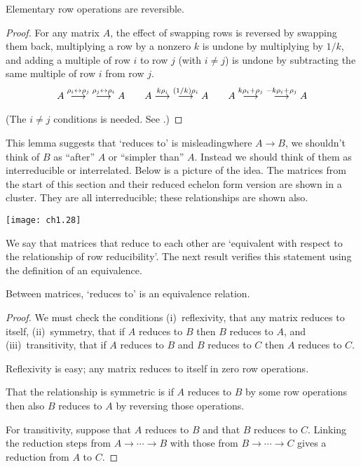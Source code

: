 \begin{lemma} \label{le:RowOpsRev}
Elementary row operations are reversible.
\end{lemma}

\begin{proof}
For any matrix \( A \),
the effect of swapping rows is reversed by swapping them back,
multiplying a row by a nonzero \( k \) is undone by multiplying by
$1/k$,
and adding a multiple of row \( i \) to row \( j \) (with $i\neq j$)
is undone by subtracting the same multiple of row \( i \) from row \( j \).
\begin{equation*}
      A
     \mathrel{ \mathop{\longrightarrow}\limits^{\rho_i\leftrightarrow\rho_j\mathstrut}_{ \begin{subarray}{l} \relax \end{subarray}}}
     \;\mathrel{ \mathop{\longrightarrow}\limits^{\rho_j\leftrightarrow\rho_i\mathstrut}_{ \begin{subarray}{l} \relax \end{subarray}}}
      A
  \qquad
        A
     \mathrel{ \mathop{\longrightarrow}\limits^{k\rho_i\mathstrut}_{ \begin{subarray}{l} \relax \end{subarray}}}
     \;\mathrel{ \mathop{\longrightarrow}\limits^{(1/k)\rho_i\mathstrut}_{ \begin{subarray}{l} \relax \end{subarray}}}
      A
  \qquad
        A
     \mathrel{ \mathop{\longrightarrow}\limits^{k\rho_i+\rho_j\mathstrut}_{ \begin{subarray}{l} \relax \end{subarray}}}
     \;\mathrel{ \mathop{\longrightarrow}\limits^{-k\rho_i+\rho_j\mathstrut}_{ \begin{subarray}{l} \relax \end{subarray}}}
      A                          
\end{equation*}
(The $i\neq j$ conditions is needed.
See .)
\end{proof}

This lemma suggests that `reduces to' is misleading\Dash where
\( A\longrightarrow B \), we shouldn't think of \( B \) as
``after'' \( A \) or ``simpler than'' $A$.
Instead we should think of them as interreducible or interrelated.
Below is a picture of the idea.
The matrices from the start of this section and their
reduced echelon form version are shown in a cluster.
They are all interreducible;
these relationships are shown also. 
\begin{center}  
  \texttt{[image: ch1.28]}
\end{center}

We say 
that matrices that reduce to each other are `equivalent with respect
to the relationship of row reducibility'.
The next result verifies this statement using the definition of 
an equivalence.

\begin{lemma}
Between matrices, `reduces to' is an equivalence re\-la\-tion.
\end{lemma}

\begin{proof}
We must check the conditions
(i)~reflexivity, that any matrix reduces to itself,
(ii)~symmetry, that if \( A \) reduces to \( B \) then
   \( B \) reduces to \( A \),
and (iii)~transitivity, that if \( A \) reduces to \( B \) and
      \( B \) reduces to \( C \) then \( A \) reduces to
      \( C \).

Reflexivity is easy; any  matrix reduces to itself in zero row operations.

That the relationship is symmetric is \Dash if
\( A \) reduces to \( B \) by some row operations
then also \( B \) reduces to \( A \) by reversing those operations.

For transitivity, suppose that \( A \) reduces to \( B \) and
that \( B \) reduces to \( C \).
Linking the reduction steps from $A \rightarrow\cdots\rightarrow B$
with those from  $B \rightarrow\cdots\rightarrow C$ 
gives a reduction from \( A \) to \( C \).
\end{proof}

